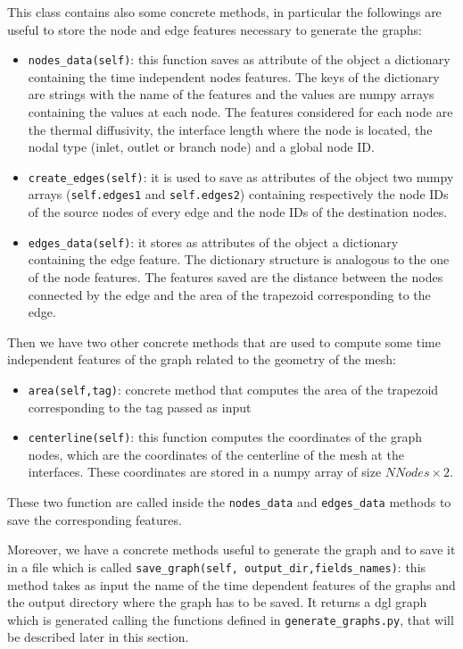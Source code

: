 \documentclass[11pt,a4paper]{article}
\begin{document}
This class contains also some concrete methods, in particular the followings are useful to store the node and edge features necessary to generate the graphs:
\begin{itemize}
    \item \texttt{nodes\_data(self)}: this function saves as attribute of the object a dictionary containing the time independent nodes features. The keys of the dictionary are strings with the name of the features and the values are numpy arrays containing the values at each node. The features considered for each node are the thermal diffusivity, the interface length where the node is located, the nodal type (inlet, outlet or branch node) and a global node ID.
    \item \texttt{create\_edges(self)}: it is used to save as attributes of the object two numpy arrays (\texttt{self.edges1} and \texttt{self.edges2}) containing respectively the node IDs of the source nodes of every edge and the node IDs of the destination nodes.
    \item \texttt{edges\_data(self)}: it stores as attributes of the object a dictionary containing the edge feature. The dictionary structure is analogous to the one of the node features. The features saved are the distance between the nodes connected by the edge and the area of the trapezoid corresponding to the edge.
\end{itemize}

Then we have two other concrete methods that are used to compute some time independent features of the graph related to the geometry of the mesh:
\begin{itemize}
    \item \texttt{area(self,tag)}: concrete method that computes the area of the trapezoid corresponding to the tag passed as input 
    \item \texttt{centerline(self)}: this function computes the coordinates of the graph nodes, which are the coordinates of the centerline of the mesh at the interfaces. These coordinates are stored in a numpy array of size \(NNodes \times 2\).
\end{itemize}
These two function are called inside the \texttt{nodes\_data} and \texttt{edges\_data} methods to save the corresponding features.

Moreover, we have a concrete methods useful to generate the graph and to save it in a file which is called \texttt{save\_graph(self, output\_dir,fields\_names)}: this method takes as input the name of the time dependent features of the graphs and the output directory where the graph has to be saved. It returns a dgl graph which is generated calling the functions defined in \texttt{generate\_graphs.py}, that will be described later in this section. 
\end{document}
